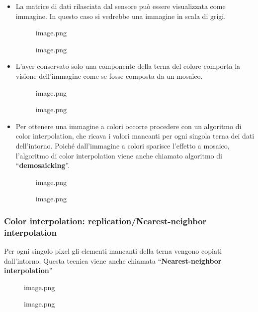\documentclass[
]{article}
\begin{document}
\begin{itemize}
\item
  La matrice di dati rilasciata dal sensore può essere visualizzata come immagine. In questo caso si vedrebbe una immagine in scala di grigi.

  \begin{figure}
  \centering
  {image.png}
  \caption{image.png}
  \end{figure}
\item
  L'aver conservato solo una componente della terna del colore comporta la visione dell'immagine come se fosse composta da un mosaico.

  \begin{figure}
  \centering
  {image.png}
  \caption{image.png}
  \end{figure}
\item
  Per ottenere una immagine a colori occorre procedere con un algoritmo di color interpolation, che ricava i valori mancanti per ogni singola terna dei dati dell'intorno.
  Poiché dall'immagine a colori sparisce l'effetto a mosaico, l'algoritmo di color interpolation viene anche chiamato algoritmo di ``\textbf{demosaicking}''.

  \begin{figure}
  \centering
  {image.png}
  \caption{image.png}
  \end{figure}
\end{itemize}

\hypertarget{color-interpolation-replicationnearest-neighbor-interpolation}{%
\subsubsection{Color interpolation: replication/Nearest-neighbor interpolation}\label{color-interpolation-replicationnearest-neighbor-interpolation}}

Per ogni singolo pixel gli elementi mancanti della terna vengono copiati dall'intorno. Questa tecnica viene anche chiamata ``\textbf{Nearest-neighbor interpolation}''

\begin{figure}
\centering
{image.png}
\caption{image.png}
\end{figure}
\end{document}
